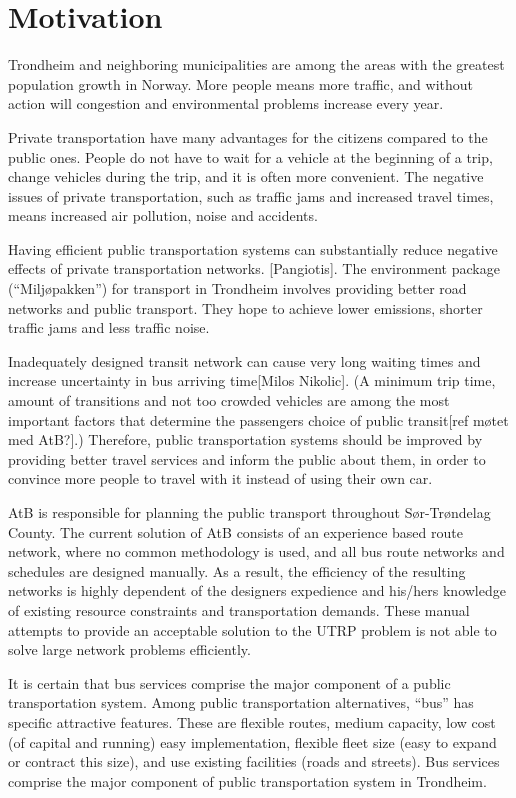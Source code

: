 \section{Motivation}

Trondheim and neighboring municipalities are among the areas with the greatest population growth in Norway. More people means more traffic, and without action will congestion and environmental problems increase every year. 

Private transportation have many advantages for the citizens compared to the public ones. People do not have to wait for a vehicle at the beginning of a trip, change vehicles during the trip, and it is often more convenient. The negative issues of private transportation, such as traffic jams and increased travel times, means increased air pollution, noise and accidents. 

Having efficient public transportation systems can substantially reduce negative effects of private transportation networks. 
[Pangiotis]. The environment package (“Miljøpakken”) for transport in Trondheim involves providing better road networks and public transport. They hope to achieve lower emissions, shorter traffic jams and less traffic noise.


  Inadequately designed transit network can cause very long waiting times and increase uncertainty in bus arriving time[Milos Nikolic]. (A minimum trip time, amount of transitions and not too crowded vehicles are among the most important factors that determine the passengers choice of public transit[ref møtet med AtB?].) Therefore, public transportation systems should be improved by providing better travel services and inform the public about them, in order to convince more people to travel with it instead of using their own car. 

AtB is responsible for planning the public transport throughout Sør-Trøndelag County. The current solution of AtB consists of an experience based route network, where no common methodology is used, and all bus route networks and schedules are designed manually. As a result, the efficiency of the resulting networks is highly dependent of the designers expedience and his/hers knowledge of existing resource constraints and transportation demands. These manual attempts to provide an acceptable solution to the UTRP problem is not able to solve large network problems efficiently. 

It is certain that bus services comprise the major component of a public transportation system. Among public transportation alternatives, “bus” has specific attractive features. These are flexible routes, medium capacity, low cost (of capital and running) easy implementation, flexible fleet size (easy to expand or contract this size), and use existing facilities (roads and streets). Bus services comprise the major component of public transportation system in Trondheim.

